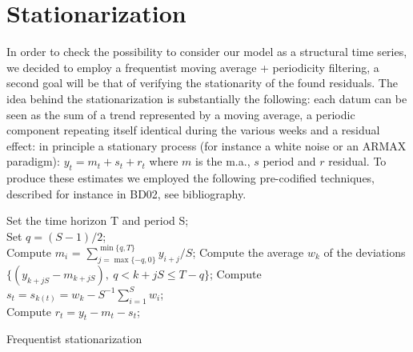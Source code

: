 \documentclass[11pt,twoside]{report}
\begin{document}
\section{Stationarization}
In order to check the possibility to consider our model as a structural time series, we decided to employ a frequentist moving average + periodicity filtering, a second goal will be that of verifying the stationarity of the found residuals. The idea behind the stationarization is substantially the following: each datum can be seen as the sum of a trend represented by a moving average, a periodic component repeating itself identical during the various weeks and a residual effect: in principle a stationary process (for instance a white noise or an ARMAX paradigm): $ y_t = m_t + s_t +r_t $ where $ m $ is the m.a., $ s $ period and $ r $ residual. To produce these estimates we employed the following pre-codified techniques, described for instance in BD02, see bibliography.\\

\begin{algorithm}[H]
	\SetAlgoLined
	Set the time horizon T and period S;\\
	Set $ q=(S-1)/2 $;\\
	{
		Compute $ m_i $ = $\sum_{j=\max\{-q,0\}}^{\min\{q,T\}} y_{i+j}/S$;
	}
	{
		Compute the average $ w_k $ of the deviations $ \{(y_{k+jS} - m_{k+jS} ),\ q < k+jS \leq T-q\} $;
	}
	{
		Compute  $ s_t = s_{k(t)} = w_k-S^{-1}\sum_{i=1}^{S}w_i $;\\
		Compute  $ r_t=y_t-m_t-s_t $;
	}

	\caption{Frequentist stationarization}
	
\end{algorithm}
\end{document}
